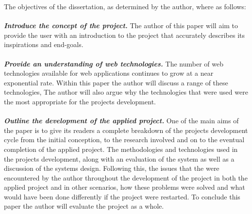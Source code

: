The objectives of the dissertation, as determined by the author, where as follows: \\ \\
\textbf{\emph{Introduce the concept of the project.}} The author of this paper will aim to provide the user with an introduction to the project that accurately describes its inspirations and end-goals. \\ \\
\textbf{\emph{Provide an understanding of web technologies.}} The number of web technologies available for web applications continues to grow at a near exponential rate. Within this paper the author will discuss a range of these technologies, The author will also argue why the technologies that were used were the most appropriate for the projects development. \\ \\
\textbf{\emph{Outline the development of the applied project.}} One of the main aims of the paper is to give its readers a complete breakdown of the projects development cycle from the initial conception, to the research involved and on to the eventual completion of the applied project. The methodologies and technologies used in the projects development, along with an evaluation of the system as well as a discussion of the systems design. Following this, the issues that the were encountered by the author throughout the development of the project in both the applied project and in other scenarios, how these problems were solved and what would have been done differently if the project were restarted. To conclude this paper the author will evaluate the project as a whole. \\ \\

